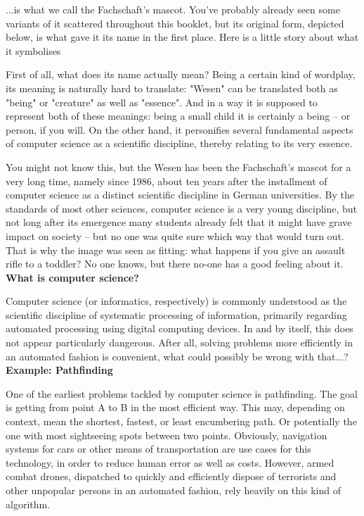 {...is what we call the Fachschaft's mascot. You've probably already seen some variants of it scattered throughout this booklet, but its original form, depicted below, is what gave it its name in the first place. Here is a little story about what it symbolises}
{
	
First of all, what does its name actually mean? Being a certain kind of wordplay, its meaning is naturally hard to translate: "Wesen" can be translated both as "being" or "creature" as well as "essence".
And in a way it is supposed to represent both of these meanings: being a small child it is certainly a being -- or person, if you will.
On the other hand, it personifies several fundamental aspects of computer science as a scientific discipline, thereby relating to its very essence.

You might not know this, but the Wesen has been the Fachschaft's mascot for a very long time, namely since 1986, about ten years after the installment of computer science as a distinct scientific discipline in German universities.
By the standards of most other sciences, computer science is a very young discipline, but not long after its emergence many students already felt that it might have grave impact on society -- but no one was quite sure which way that would turn out.
That is why the image was seen as fitting: what happens if you give an assault rifle to a toddler? No one knows, but there no-one has a good feeling about it.\\

\textbf{What is computer science?}

Computer science (or informatics, respectively) is commonly understood as the scientific discipline of systematic processing of information, primarily regarding automated processing using digital computing devices.
In and by itself, this does not appear particularly dangerous. After all, solving problems more efficiently in an automated fashion is convenient, what could possibly be wrong with that...?\\

\textbf{Example: Pathfinding}

One of the earliest problems tackled by computer science is pathfinding. The goal is getting from point A to B in the most efficient way.
This may, depending on context, mean the shortest, fastest, or least encumbering path. Or potentially the one with most sightseeing spots between two points.
Obviously, navigation systems for cars or other means of transportation are use cases for this technology, in order to reduce human error as well as costs.
However, armed combat drones, dispatched to quickly and efficiently dispose of terrorists and other unpopular persons in an automated fashion, rely heavily on this kind of algorithm.\\

}
